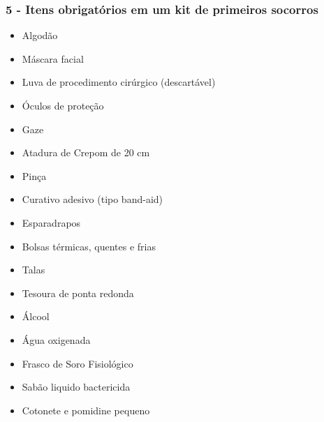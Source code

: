 \documentclass{beamer}
\begin{document}
\begin{frame}
\frametitle{5 - Itens obrigatórios em um kit de primeiros socorros}
\begin{itemize}
    \item Algodão
    \item Máscara facial
    \item Luva de procedimento cirúrgico (descartável)
    \item Óculos de proteção
    \item Gaze
    \item Atadura de Crepom de 20 cm
    \item Pinça
    \item Curativo adesivo (tipo band-aid)
    \item Esparadrapos
    \item Bolsas térmicas, quentes e frias
    \item Talas
    \item Tesoura de ponta redonda
    \item Álcool
    \item Água oxigenada
    \item Frasco de Soro Fisiológico
    \item Sabão liquido bactericida
    \item Cotonete e pomidine pequeno
\end{itemize}
\end{frame}
\end{document}
